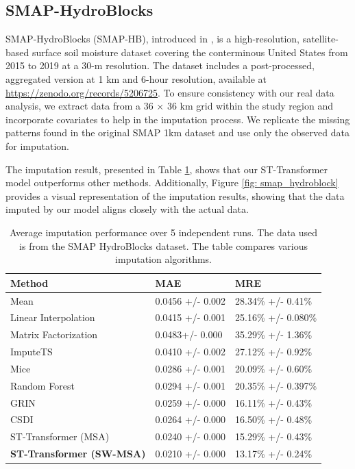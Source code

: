 \documentclass[review]{elsarticle}
\begin{document}
\subsection{SMAP-HydroBlocks}
SMAP-HydroBlocks (SMAP-HB), introduced in \citet{vergopolan2021smap}, is a high-resolution, satellite-based surface soil moisture dataset covering the conterminous United States from 2015 to 2019 at a 30-m resolution. The dataset includes a post-processed, aggregated version at 1 km and 6-hour resolution, available at \href{https://zenodo.org/records/5206725}{https://zenodo.org/records/5206725}. To ensure consistency with our real data analysis, we extract data from a 36 $\times$ 36 km grid within the study region and incorporate covariates to help in the imputation process. We replicate the missing patterns found in the original SMAP 1km dataset and use only the observed data for imputation. 

The imputation result, presented in Table \ref{tab: smap_hydroblock}, shows that our ST-Transformer model outperforms other methods. Additionally, Figure \ref{fig: smap_hydroblock} provides a visual representation of the imputation results, showing that the data imputed by our model aligns closely with the actual data. 
\begin{table}
    \centering
    \begin{tabularx}{\textwidth}{lXX}
        \toprule
       Method & MAE & MRE \\
        \midrule
        Mean & 0.0456 +/- 0.002& 28.34\% +/- 0.41\%  \\
        Linear Interpolation & 0.0415 +/- 0.001 & 25.16\% +/- 0.080\%\\
        Matrix Factorization & 0.0483+/- 0.000 & 35.29\% +/- 1.36\% \\
        ImputeTS & 0.0410 +/- 0.002 & 27.12\% +/- 0.92\% \\
        Mice & 0.0286 +/- 0.001& 20.09\% +/- 0.60\% \\
        Random Forest &  0.0294 +/- 0.001&  20.35\% +/- 0.397\%\\
   		GRIN &0.0259 +/- 0.000 & 16.11\% +/- 0.43\%\\
        CSDI & 0.0264 +/- 0.000 & 16.50\% +/- 0.48\%\\
        ST-Transformer (MSA) & 0.0240 +/- 0.000 & 15.29\% +/- 0.43\%\\
        \textbf{ST-Transformer (SW-MSA)} & 0.0210 +/- 0.000 & 13.17\% +/- 0.24\%\\
        
        \bottomrule

        
    \end{tabularx}
    \caption{Average imputation performance over 5 independent runs. The data used is from the SMAP HydroBlocks dataset. The table compares various imputation algorithms.}
    \label{tab: smap_hydroblock}
\end{table}
\end{document}
